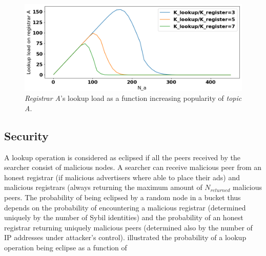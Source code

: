 \begin{figure}[t]
    \includegraphics[width=1\linewidth]{img/fairness_lookup}
    \caption{\emph{Registrar A}'s lookup load as a function increasing popularity of \emph{topic A}.
    }
    \label{fig:fairness_lookup}
\end{figure}

\subsection{Security}

A lookup operation is considered as eclipsed if all the peers received by the searcher consist of malicious nodes. A searcher can receive malicious peer from an honest registrar (if malicious advertisers where able to place their ads) and malicious registrars (always returning the maximum amount of $N_\textit{returned}$ malicious peers. The probability of being eclipsed by a random node in a bucket thus depends on the probability of encountering a malicious registrar (determined uniquely by the number of Sybil identities) and the probability of an honest registrar returning uniquely malicious peers (determined also by the number of IP addresses under attacker's control).  illustrated the probability of a lookup operation being eclipse as a function of 


